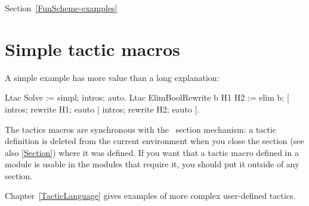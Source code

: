 \SeeAlso Section~\ref{FunScheme-examples}


\section{Simple tactic macros
\label{TacticDefinition}}

A simple example has more value than a long explanation: 

\begin{coq_example}
Ltac Solve := simpl; intros; auto.
Ltac ElimBoolRewrite b H1 H2 :=
  elim b; [ intros; rewrite H1; eauto | intros; rewrite H2; eauto ].
\end{coq_example}

The tactics macros are synchronous with the \Coq\ section mechanism:
a tactic definition is deleted from the current environment
when you close the section (see also \ref{Section}) 
where it was defined. If you want that a
tactic macro defined in a module is usable in the modules that
require it, you should put it outside of any section.

Chapter~\ref{TacticLanguage} gives examples of more complex
user-defined tactics.



